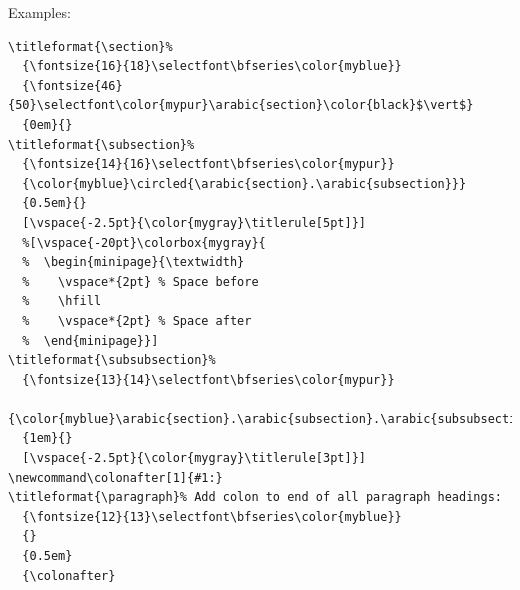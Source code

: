 \documentclass{article}
\begin{document}
Examples:
\begin{lstlisting}
\titleformat{\section}%
  {\fontsize{16}{18}\selectfont\bfseries\color{myblue}}
  {\fontsize{46}{50}\selectfont\color{mypur}\arabic{section}\color{black}$\vert$}
  {0em}{}
\titleformat{\subsection}%
  {\fontsize{14}{16}\selectfont\bfseries\color{mypur}}
  {\color{myblue}\circled{\arabic{section}.\arabic{subsection}}}
  {0.5em}{}
  [\vspace{-2.5pt}{\color{mygray}\titlerule[5pt]}]
  %[\vspace{-20pt}\colorbox{mygray}{
  %  \begin{minipage}{\textwidth}
  %    \vspace*{2pt} % Space before
  %    \hfill
  %    \vspace*{2pt} % Space after
  %  \end{minipage}}]
\titleformat{\subsubsection}%
  {\fontsize{13}{14}\selectfont\bfseries\color{mypur}}
  {\color{myblue}\arabic{section}.\arabic{subsection}.\arabic{subsubsection}}
  {1em}{}
  [\vspace{-2.5pt}{\color{mygray}\titlerule[3pt]}]
\newcommand\colonafter[1]{#1:}
\titleformat{\paragraph}% Add colon to end of all paragraph headings:
  {\fontsize{12}{13}\selectfont\bfseries\color{myblue}}
  {}
  {0.5em}
  {\colonafter}
\end{lstlisting}
\end{document}
